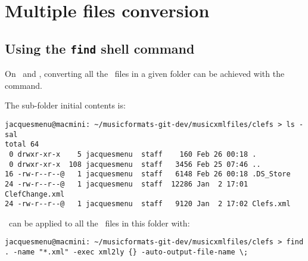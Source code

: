 



\chapter{Multiple files conversion}

\section{Using the {\tt find} shell command}

On \MacOS\ and \Linux, converting all the \mxml\ files in a given folder can be achieved with the  command.

The  sub-folder initial contents is:
\begin{lstlisting}[language=Terminal]
jacquesmenu@macmini: ~/musicformats-git-dev/musicxmlfiles/clefs > ls -sal
total 64
 0 drwxr-xr-x    5 jacquesmenu  staff    160 Feb 26 00:18 .
 0 drwxr-xr-x  108 jacquesmenu  staff   3456 Feb 25 07:46 ..
16 -rw-r--r--@   1 jacquesmenu  staff   6148 Feb 26 00:18 .DS_Store
24 -rw-r--r--@   1 jacquesmenu  staff  12286 Jan  2 17:01 ClefChange.xml
24 -rw-r--r--@   1 jacquesmenu  staff   9120 Jan  2 17:02 Clefs.xml
\end{lstlisting}

\xmlToLy\ can be applied to all the \mxml\ files in this folder with:
\begin{lstlisting}[language=Terminal]
jacquesmenu@macmini: ~/musicformats-git-dev/musicxmlfiles/clefs > find . -name "*.xml" -exec xml2ly {} -auto-output-file-name \;
\end{lstlisting}

